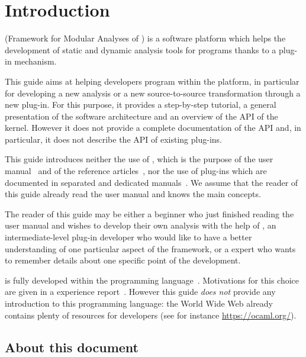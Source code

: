 
\chapter{Introduction}

\framac (Framework for Modular Analyses of \C) is a software platform which
helps the development of static and dynamic analysis tools for \C programs
thanks to a plug-in mechanism.

This guide aims at helping developers program within the \framac platform,
in particular for developing a new analysis or a new source-to-source
transformation through a new plug-in. For this purpose, it provides a
step-by-step tutorial, a general presentation of the \framac software
architecture and an overview of the
API of the \framac kernel. However it does not provide a complete documentation
of the \framac API and, in particular, it does not describe the API of
existing \framac plug-ins.

This guide introduces neither the use of \framac, which is the purpose of the
user manual~\cite{userman} and of the reference articles~\cite{sefm12,fac15},
nor the use of plug-ins which are documented in separated and dedicated
manuals~\cite{slicing,wp,value,rte,aorai}.  We assume that the reader of this
guide already read the \framac user manual and knows the main \framac concepts.

The reader of this guide may be either a \framac beginner who just finished
reading the user manual and wishes to develop their own analysis with the help
of \framac, an intermediate-level plug-in developer who would like to have
a better understanding of one particular aspect of the framework,
or a \framac expert who wants to remember details about one specific point
of the \framac development.

\framac is fully developed within the \ocaml programming
language~\cite{caml}. Motivations for this choice are given in a \framac
experience report~\cite{framac-experience}. However this guide \emph{does not}
provide any introduction to this programming language: the World Wide Web
already contains plenty of resources for \caml developers (see for instance
\url{https://ocaml.org/}).

\section{About this document}

